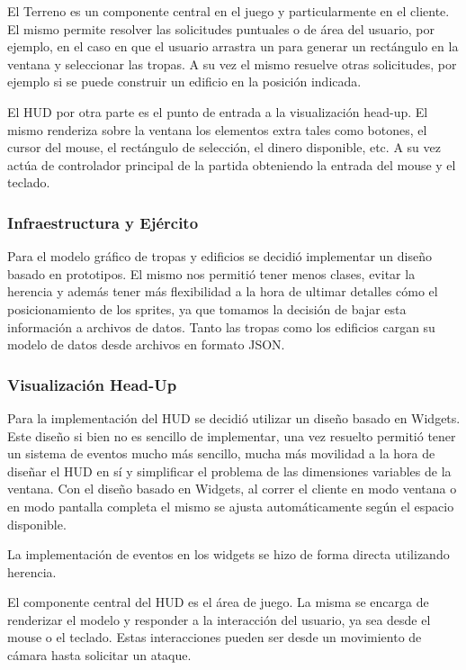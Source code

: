 \documentclass[titlepage,a4paper,12pt]{article}
\begin{document}
El Terreno es un componente central en el juego y particularmente en el cliente. El mismo permite resolver las solicitudes puntuales o de área del usuario, por ejemplo, en el caso en que el usuario arrastra un para generar un rectángulo en la ventana y seleccionar las tropas. A su vez el mismo resuelve otras solicitudes, por ejemplo si se puede construir un edificio en la posición indicada.

El HUD por otra parte es el punto de entrada a la visualización head-up. El mismo renderiza sobre la ventana los elementos extra tales como botones, el cursor del mouse, el rectángulo de selección, el dinero disponible, etc. A su vez actúa de controlador principal de la partida obteniendo la entrada del mouse y el teclado.

\subsubsection{Infraestructura y Ejército}
Para el modelo gráfico de tropas y edificios se decidió implementar un diseño basado en prototipos. El mismo nos permitió tener menos clases, evitar la herencia y además tener más flexibilidad a la hora de ultimar detalles cómo el posicionamiento de los sprites, ya que tomamos la decisión de bajar esta información a archivos de datos. Tanto las tropas como los edificios cargan su modelo de datos desde archivos en formato JSON.

\subsubsection{Visualización Head-Up}
Para la implementación del HUD se decidió utilizar un diseño basado en Widgets. Este diseño si bien no es sencillo de implementar, una vez resuelto permitió tener un sistema de eventos mucho más sencillo, mucha más movilidad a la hora de diseñar el HUD en sí y simplificar el problema de las dimensiones variables de la ventana. Con el diseño basado en Widgets, al correr el cliente en modo ventana o en modo pantalla completa el mismo se ajusta automáticamente según el espacio disponible.

La implementación de eventos en los widgets se hizo de forma directa utilizando herencia.

El componente central del HUD es el área de juego. La misma se encarga de renderizar el modelo y responder a la interacción del usuario, ya sea desde el mouse o el teclado. Estas interacciones pueden ser desde un movimiento de cámara hasta solicitar un ataque.
\end{document}
